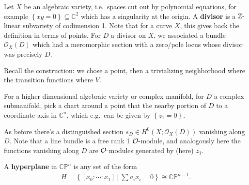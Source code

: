 \begin{remark}

Let \(X\) be an algebraic variety, i.e.~spaces cut out by polynomial
equations, for example
\(\left\{{ xy = 0 }\right\} \subseteq {\mathbb{C}}^2\) which has a
singularity at the origin. A \textbf{divisor} is a
\({\mathbb{Z}}{\hbox{-}}\)linear subvariety of codimension 1. Note that
for a curve \(X\), this gives back the definition in terms of points.
For \(D\) a divisor on \(X\), we associated a bundle
\({\mathcal{O}}_X(D)\) which had a meromorphic section with a zero/pole
locus whose divisor was precisely \(D\).

Recall the construction: we chose a point, then a trivializing
neighborhood where the transition functions where \(V\).

\begin{figure}
\centering
{}
\end{figure}

For a higher dimensional algebraic variety or complex manifold, for
\(D\) a complex submanifold, pick a chart around a point that the nearby
portion of \(D\) to a coordinate axis in \({\mathbb{C}}^n\), which
e.g.~can be given by \(\left\{{ z_1 = 0 }\right\}\).

\begin{figure}
\centering
{}
\end{figure}

As before there's a distinguished section
\(s_D \in H^0(X; {\mathcal{O}}_X(D) )\) vanishing along \(D\). Note that
a line bundle is a free rank 1 \({\mathcal{O}}{\hbox{-}}\)module, and
analogously here the functions vanishing along \(D\) are
\({\mathcal{O}}{\hbox{-}}\)modules generated by (here) \(z_1\).

\end{remark}

\begin{definition}[Hyperplane]

A \textbf{hyperplane} in \({\mathbb{CP}}^n\) is any set of the form
\begin{align*}
H = \left\{{ [x_0: \cdots : x_1 ] {~\mathrel{\Big|}~}\sum a_i x_i = 0 }\right\} \cong {\mathbb{CP}}^{n-1}
.\end{align*}

\end{definition}

